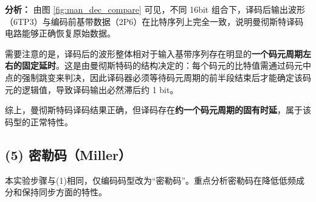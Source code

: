 \documentclass{xjtureport}
\begin{document}
\begin{enumerate}[label=\roman*.]
		\textbf{分析：}
		由图 \ref{fig:man_dec_compare} 可见，不同 16bit 组合下，译码后输出波形（6TP3）与编码前基带数据（2P6）在比特序列上完全一致，说明曼彻斯特译码电路能够正确恢复原始数据。
		
		需要注意的是，译码后的波形整体相对于输入基带序列存在明显的\textbf{一个码元周期左右的固定延时}。这是由曼彻斯特码的结构决定的：每个码元的比特值需通过码元中点的强制跳变来判决，因此译码器必须等待码元周期的前半段结束后才能确定该码元的逻辑值，导致译码输出必然滞后约 1 bit。
		
		综上，曼彻斯特码译码结果正确，但译码存在\textbf{约一个码元周期的固有时延}，属于该码型的正常特性。
		
		
		\vspace{3em}
	\end{enumerate}
	
	
	\subsection*{(5) 密勒码（Miller）}
	本实验步骤与(1)相同，仅编码码型改为“密勒码”。重点分析密勒码在降低低频成分和保持同步方面的特性。
	
\end{document}
